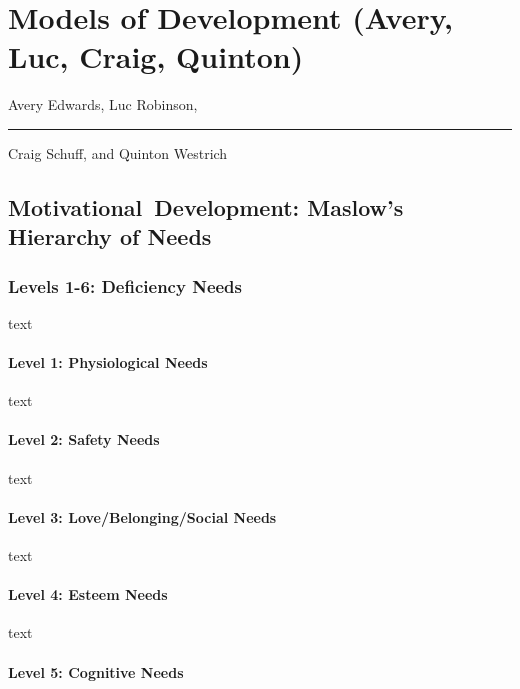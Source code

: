 \chapter{Models of Development (Avery, Luc, Craig, Quinton)}

\begin{authors}
	Avery Edwards, Luc Robinson, \\ \rule{0.5cm}{0cm} Craig Schuff, and Quinton Westrich
\end{authors}


\section{\mbox{Motivational Development:} Maslow's Hierarchy of Needs}


\subsection{Levels 1-6: Deficiency Needs}

text

\subsubsection{Level 1: Physiological Needs}

text

\subsubsection{Level 2: Safety Needs}

text

\subsubsection{Level 3: Love/Belonging/Social Needs}

text

\subsubsection{Level 4: Esteem Needs}

text

\subsubsection{Level 5: Cognitive Needs}

